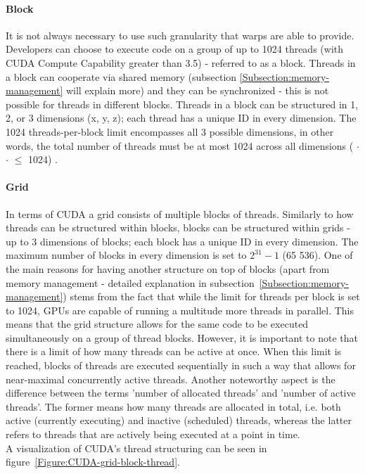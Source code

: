 \paragraph{Block}
It is not always necessary to use such granularity that warps are able to provide. Developers can choose to execute code on a group of up to 1024 threads (with CUDA Compute Capability greater than 3.5) - referred to as a block. Threads in a block can cooperate via shared memory (subsection \ref{Subsection:memory-management} will explain more) and they can be synchronized - this is not possible for threads in different blocks. Threads in a block can be structured in 1, 2, or 3 dimensions (x, y, z); each thread has a unique ID in every dimension. The 1024 threads-per-block limit encompasses all 3 possible dimensions, in other words, the total number of threads must be at most 1024 across all dimensions ( $ \cdot $  $ \cdot $  $ \leq$ 1024) \cite{AbiChahla18June2008, NVIDIAMay2022}.

\paragraph{Grid}\label{Paragraph:CUDA-thread-management-grid}
In terms of CUDA a grid consists of multiple blocks of threads. Similarly to how threads can be structured within blocks, blocks can be structured within grids - up to 3 dimensions of blocks; each block has a unique ID in every dimension. The maximum number of blocks in every dimension is set to $ 2^{31} - 1 $ (65 536). One of the main reasons for having another structure on top of blocks (apart from memory management - detailed explanation in subsection~\ref{Subsection:memory-management}) stems from the fact that while the limit for threads per block is set to 1024, GPUs are capable of running a multitude more threads in parallel. This means that the grid structure allows for the same code to be executed simultaneously on a group of thread blocks. However, it is important to note that there is a limit of how many threads can be active at once. When this limit is reached, blocks of threads are executed sequentially in such a way that allows for near-maximal concurrently active threads. Another noteworthy aspect is the difference between the terms 'number of allocated threads' and 'number of active threads'. The former means how many threads are allocated in total, i.e. both active (currently executing) and inactive (scheduled) threads, whereas the latter refers to threads that are actively being executed at a point in time. \\
A visualization of CUDA's thread structuring can be seen in figure~\ref{Figure:CUDA-grid-block-thread}.

